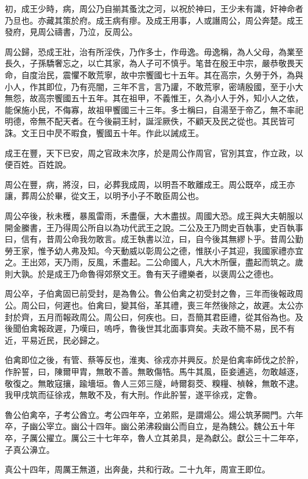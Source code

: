 初，成王少時，病，周公乃自揃其蚤沈之河，以祝於神曰，王少未有識，奸神命者乃旦也。亦藏其策於府。成王病有瘳。及成王用事，人或譖周公，周公奔楚。成王發府，見周公禱書，乃泣，反周公。

周公歸，恐成王壯，治有所淫佚，乃作多士，作毋逸。毋逸稱，為人父母，為業至長久，子孫驕奢忘之，以亡其家，為人子可不慎乎。笔昔在殷王中宗，嚴恭敬畏天命，自度治民，震懼不敢荒寧，故中宗饗國七十五年。其在高宗，久勞于外，為與小人，作其即位，乃有亮闇，三年不言，言乃讙，不敢荒寧，密靖殷國，至于小大無怨，故高宗饗國五十五年。其在祖甲，不義惟王，久為小人于外，知小人之依，能保施小民，不侮寡，故祖甲饗國三十三年。多士稱曰，自湯至于帝乙，無不率祀明德，帝無不配天者。在今後嗣王紂，誕淫厥佚，不顧天及民之從也。其民皆可誅。文王日中昃不暇食，饗國五十年。作此以誡成王。

成王在豐，天下已安，周之官政未次序，於是周公作周官，官別其宜，作立政，以便百姓。百姓說。

周公在豐，病，將沒，曰，必葬我成周，以明吾不敢離成王。周公既卒，成王亦讓，葬周公於畢，從文王，以明予小子不敢臣周公也。

周公卒後，秋未穫，暴風雷雨，禾盡偃，大木盡拔。周國大恐。成王與大夫朝服以開金縢書，王乃得周公所自以為功代武王之說。二公及王乃問史百執事，史百執事曰，信有，昔周公命我勿敢言。成王執書以泣，曰，自今後其無繆卜乎。昔周公勤勞王家，惟予幼人弗及知。今天動威以彰周公之德，惟朕小子其迎，我國家禮亦宜之。王出郊，天乃雨，反風，禾盡起。二公命國人，凡大木所偃，盡起而筑之。歲則大孰。於是成王乃命魯得郊祭文王。魯有天子禮樂者，以褒周公之德也。

周公卒，子伯禽固已前受封，是為魯公。魯公伯禽之初受封之魯，三年而後報政周公。周公曰，何遲也。伯禽曰，變其俗，革其禮，喪三年然後除之，故遲。太公亦封於齊，五月而報政周公。周公曰，何疾也。曰，吾簡其君臣禮，從其俗為也。及後聞伯禽報政遲，乃嘆曰，嗚呼，魯後世其北面事齊矣。夫政不簡不易，民不有近，平易近民，民必歸之。

伯禽即位之後，有管、蔡等反也，淮夷、徐戎亦并興反。於是伯禽率師伐之於肸，作肸誓，曰，陳爾甲胄，無敢不善。無敢傷牿。馬牛其風，臣妾逋逃，勿敢越逐，敬復之。無敢寇攘，踰墻垣。魯人三郊三隧，峙爾芻茭、糗糧、楨榦，無敢不逮。我甲戌筑而征徐戎，無敢不及，有大刑。作此肸誓，遂平徐戎，定魯。

魯公伯禽卒，子考公酋立。考公四年卒，立弟熙，是謂煬公。煬公筑茅闕門。六年卒，子幽公宰立。幽公十四年。幽公弟沸殺幽公而自立，是為魏公。魏公五十年卒，子厲公擢立。厲公三十七年卒，魯人立其弟具，是為獻公。獻公三十二年卒，子真公濞立。

真公十四年，周厲王無道，出奔彘，共和行政。二十九年，周宣王即位。

